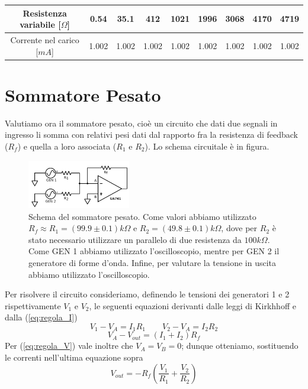 \documentclass {article}
\begin{document}
\begin{center}
\begin{tabular}{c|c|c|c|c|c|c|c|c}
Resistenza variabile [$\Omega$] & 0.54 & 35.1 & 412 & 1021 & 1996 & 3068 & 4170 & 4719 \\ 
\hline 
Corrente nel carico [$mA$] & 1.002 & 1.002 & 1.002 & 1.002 & 1.002 & 1.002 & 1.002 & 1.002 \\ 
\end{tabular}
\end{center}

\section{Sommatore Pesato}

Valutiamo ora il sommatore pesato, cioè un circuito che dati due segnali in ingresso li somma con relativi pesi dati dal rapporto fra la resistenza di feedback ($R_f$) e quella a loro associata ($R_1$ e $R_2$). Lo schema circuitale è in figura.

\begin{figure}
  \begin{center}
    \includegraphics[width=0.40\textwidth]{c2.pdf}
  \end{center}
  \caption{Schema del sommatore pesato. Come valori abbiamo utilizzato $R_f \approx R_1=(99.9 \pm 0.1) k \Omega$ e $R_2=(49.8 \pm 0.1) k \Omega$, dove per $R_2$ è stato necessario utilizzare un parallelo di due resistenza da $100 k\Omega$. Come GEN 1 abbiamo utilizzato l'oscilloscopio, mentre per GEN 2 il generatore di forme d'onda. Infine, per valutare la tensione in uscita abbiamo utilizzato l'oscilloscopio.}
\end{figure}

Per risolvere il circuito consideriamo, definendo le tensioni dei generatori 1 e 2 rispettivamente $V_1$ e $V_2$, le seguenti equazioni derivanti dalle leggi di Kirkhhoff e dalla (\ref{eq:regola_I})
$$V_1 - V_A =I_1 R_1 \qquad V_2 - V_A =I_2 R_2$$
$$V_A - V_{out} =(I_1+I_2) R_f$$
Per (\ref{eq:regola_V}) vale inoltre che $V_A=V_B=0$; dunque otteniamo, sostituendo le correnti nell'ultima equazione sopra
$$V_{out}=-R_f \left( \frac{V_1}{R_1}+\frac{V_2}{R_2}\right)$$
\end{document}
